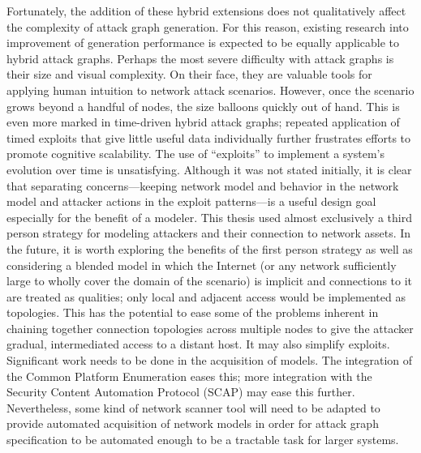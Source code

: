 Fortunately, the addition of these hybrid extensions does not qualitatively
affect the complexity of attack graph generation. For this reason, existing
research into improvement of generation performance is expected to be
equally applicable to hybrid attack graphs.
Perhaps the most severe difficulty with attack graphs is their size and visual
complexity. On their face, they are valuable tools for applying human intuition
to network attack scenarios. However, once the scenario grows beyond a handful
of nodes, the size balloons quickly out of hand. This is even more marked in
time-driven hybrid attack graphs; repeated application of timed exploits that
give little useful data individually further frustrates efforts to promote
cognitive scalability.
The use of ``exploits'' to implement a system's evolution over time is
unsatisfying. Although it was not stated initially, it is
clear that separating concerns---keeping network model and behavior in the
network model and attacker actions in the exploit patterns---is a useful
design goal especially for the benefit of a modeler.
\pagebreak[0]
This thesis used almost exclusively a third person strategy for modeling
attackers and their connection to network assets. In the future, it is worth
exploring the benefits of the first person strategy as well as considering a
blended model in which the Internet (or any network sufficiently large to
wholly cover the domain of the scenario) is implicit and connections to it are
treated as qualities; only local and adjacent access would be implemented as
topologies. This has the potential to ease some of the problems inherent in
chaining together connection topologies across multiple nodes to give the
attacker gradual, intermediated access to a distant host. It may also simplify
exploits.
Significant work needs to be done in the acquisition of models. The integration
of the Common Platform Enumeration eases this; more integration with the
Security Content Automation Protocol (SCAP) may ease this further. %
Nevertheless, some kind of network scanner tool will need to be adapted to
provide automated acquisition of network models in order for attack graph
specification to be automated enough to be a tractable task for larger systems.

